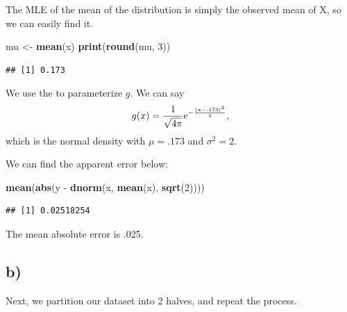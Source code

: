 \documentclass[]{article}
\newenvironment{Shaded}{\begin{snugshade}}{\end{snugshade}}
\newcommand{\KeywordTok}[1]{\textcolor[rgb]{0.13,0.29,0.53}{\textbf{{#1}}}}
\newcommand{\DecValTok}[1]{\textcolor[rgb]{0.00,0.00,0.81}{{#1}}}
\newcommand{\StringTok}[1]{\textcolor[rgb]{0.31,0.60,0.02}{{#1}}}
\newcommand{\NormalTok}[1]{{#1}}
\begin{document}
The MLE of the mean of the distribution is simply the observed mean of
X, so we can easily find it.

\begin{Shaded}
\begin{Highlighting}[]
\NormalTok{mu <-}\StringTok{ }\KeywordTok{mean}\NormalTok{(x)}
\KeywordTok{print}\NormalTok{(}\KeywordTok{round}\NormalTok{(mu, }\DecValTok{3}\NormalTok{))}
\end{Highlighting}
\end{Shaded}

\begin{verbatim}
## [1] 0.173
\end{verbatim}

We use the to parameterize \(g\). We can say \[
g(x) = \frac{1}{\sqrt{4 \pi}}\rm{e}^{-\frac{(x - .173)^2}{4}},
\] which is the normal density with \(\mu = .173\) and \(\sigma^2 = 2\).

We can find the apparent error below:

\begin{Shaded}
\begin{Highlighting}[]
\KeywordTok{mean}\NormalTok{(}\KeywordTok{abs}\NormalTok{(y -}\StringTok{ }\KeywordTok{dnorm}\NormalTok{(x, }\KeywordTok{mean}\NormalTok{(x), }\KeywordTok{sqrt}\NormalTok{(}\DecValTok{2}\NormalTok{))))}
\end{Highlighting}
\end{Shaded}

\begin{verbatim}
## [1] 0.02518254
\end{verbatim}

The mean absolute error is .025.

\subsection{b)}\label{b}

Next, we partition our dataset into 2 halves, and repeat the process.
\end{document}
